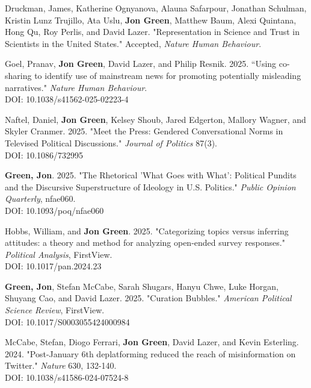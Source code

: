 \documentclass[letterpaper]{article}
\begin{document}
\begin{etaremune}

\item Druckman, James, Katherine Ognyanova, Alauna Safarpour, Jonathan Schulman, Kristin Lunz Trujillo, Ata Uslu, \textbf{Jon Green}, Matthew Baum, Alexi Quintana, Hong Qu, Roy Perlis, and David Lazer. "Representation in Science and Trust in Scientists in the United States." Accepted, \textit{Nature Human Behaviour}.

\item Goel, Pranav, \textbf{Jon Green}, David Lazer, and Philip Resnik. 2025. ``Using co-sharing to identify use of mainstream news for promoting potentially misleading narratives." \textit{Nature Human Behaviour}.\\
DOI: 10.1038/s41562-025-02223-4

\item Naftel, Daniel, \textbf{Jon Green}, Kelsey Shoub, Jared Edgerton, Mallory Wagner, and Skyler Cranmer. 2025. "Meet the Press: Gendered Conversational Norms in Televised Political Discussions." \textit{Journal of Politics} 87(3).\\
DOI: 10.1086/732995

\item \textbf{Green, Jon}. 2025. "The Rhetorical 'What Goes with What': Political Pundits and the Discursive Superstructure of Ideology in U.S. Politics." \textit{Public Opinion Quarterly}, nfae060.\\
DOI: 10.1093/poq/nfae060

\item Hobbs, William, and \textbf{Jon Green}. 2025. "Categorizing topics versus inferring attitudes: a theory and method for analyzing open-ended survey responses." \textit{Political Analysis}, FirstView.\\
DOI: 10.1017/pan.2024.23

\item \textbf{Green, Jon}, Stefan McCabe, Sarah Shugars, Hanyu Chwe, Luke Horgan, Shuyang Cao, and David Lazer. 2025. "Curation Bubbles." \textit{American Political Science Review}, FirstView.\\
DOI: 10.1017/S0003055424000984

\item McCabe, Stefan, Diogo Ferrari, \textbf{Jon Green}, David Lazer, and Kevin Esterling. 2024. "Post-January 6th deplatforming reduced the reach of misinformation on Twitter." \textit{Nature} 630, 132-140. \\
DOI: 10.1038/s41586-024-07524-8


\end{etaremune}
\end{document}
